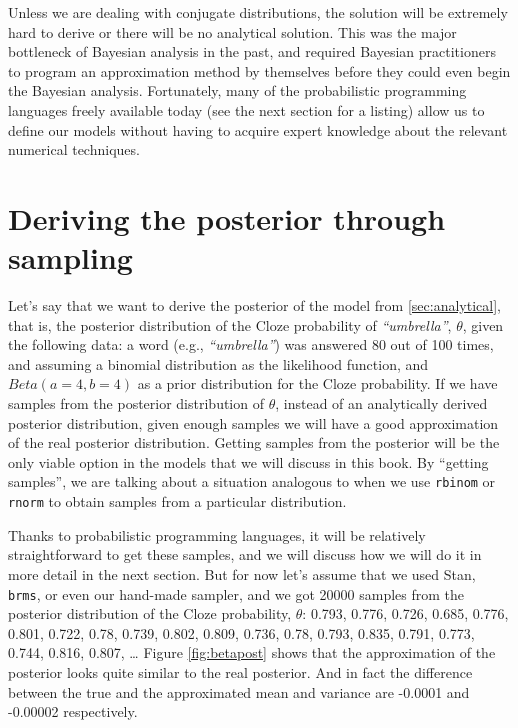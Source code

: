 \documentclass[12pt,]{krantz}
\theoremstyle{definition}
\theoremstyle{definition}
\theoremstyle{definition}
\theoremstyle{remark}
\begin{document}
Unless we are dealing with conjugate distributions, the solution will be extremely hard to derive or there will be no analytical solution. This was the major bottleneck of Bayesian analysis in the past, and required Bayesian practitioners to program an approximation method by themselves before they could even begin the Bayesian analysis. Fortunately, many of the probabilistic programming languages freely available today (see the next section for a listing) allow us to define our models without having to acquire expert knowledge about the relevant numerical techniques.

\hypertarget{deriving-the-posterior-through-sampling}{%
\section{Deriving the posterior through sampling}\label{deriving-the-posterior-through-sampling}}

Let's say that we want to derive the posterior of the model from \ref{sec:analytical}, that is, the posterior distribution of the Cloze probability of \emph{``umbrella''}, \(\theta\), given the following data: a word (e.g., \emph{``umbrella''}) was answered 80 out of 100 times, and assuming a binomial distribution as the likelihood function, and \(Beta(a=4,b=4)\) as a prior distribution for the Cloze probability. If we have samples from the posterior distribution of \(\theta\), instead of an analytically derived posterior distribution, given enough samples we will have a good approximation of the real posterior distribution. Getting samples from the posterior will be the only viable option in the models that we will discuss in this book. By ``getting samples'', we are talking about a situation analogous to when we use \texttt{rbinom} or \texttt{rnorm} to obtain samples from a particular distribution.

Thanks to probabilistic programming languages, it will be relatively straightforward to get these samples, and we will discuss how we will do it in more detail in the next section. But for now let's assume that we used Stan, \texttt{brms}, or even our hand-made sampler, and we got 20000 samples from the posterior distribution of the Cloze probability, \(\theta\): 0.793, 0.776, 0.726, 0.685, 0.776, 0.801, 0.722, 0.78, 0.739, 0.802, 0.809, 0.736, 0.78, 0.793, 0.835, 0.791, 0.773, 0.744, 0.816, 0.807, \ldots{} Figure \ref{fig:betapost} shows that the approximation of the posterior looks quite similar to the real posterior. And in fact the difference between the true and the approximated mean and variance are -0.0001 and -0.00002 respectively.
\end{document}
